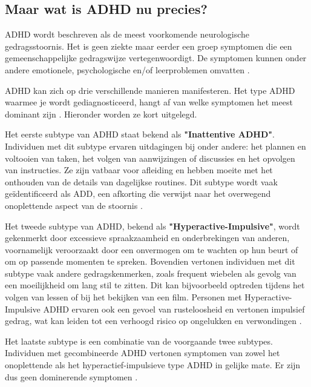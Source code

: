 \subsection{Maar wat is ADHD nu precies?}
ADHD wordt beschreven als de meest voorkomende neurologische gedragsstoornis. Het is geen ziekte maar eerder een groep symptomen die een gemeenschappelijke gedragswijze vertegenwoordigt. De symptomen kunnen onder andere emotionele, psychologische en/of leerproblemen omvatten \autocite{Furman2005whatisadhd}. \newline

ADHD kan zich op drie verschillende manieren manifesteren. Het type ADHD waarmee je wordt gediagnosticeerd, hangt af van welke symptomen het meest dominant zijn \autocite{diamond2005attention}. Hieronder worden ze kort uitgelegd. \newline

Het eerste subtype van ADHD staat bekend als \textbf{"Inattentive ADHD"}. Individuen met dit subtype ervaren uitdagingen bij onder andere: het plannen en voltooien van taken, het volgen van aanwijzingen of discussies en het opvolgen van instructies. Ze zijn vatbaar voor afleiding en hebben moeite met het onthouden van de details van dagelijkse routines. Dit subtype wordt vaak geïdentificeerd als ADD, een afkorting die verwijst naar het overwegend onoplettende aspect van de stoornis \autocite{wilcox2023what}. \newline

Het tweede subtype van ADHD, bekend als \textbf{"Hyperactive-Impulsive"}, wordt gekenmerkt door excessieve spraakzaamheid en onderbrekingen van anderen, voornamelijk veroorzaakt door een onvermogen om te wachten op hun beurt of om op passende momenten te spreken. Bovendien vertonen individuen met dit subtype vaak andere gedragskenmerken, zoals frequent wiebelen als gevolg van een moeilijkheid om lang stil te zitten. Dit kan bijvoorbeeld optreden tijdens het volgen van lessen of bij het bekijken van een film. Personen met Hyperactive-Impulsive ADHD ervaren ook een gevoel van rusteloosheid en vertonen impulsief gedrag, wat kan leiden tot een verhoogd risico op ongelukken en verwondingen \autocite{swanson1998attention}.\newline

Het laatste subtype is een combinatie van de voorgaande twee subtypes. Individuen met gecombineerde ADHD vertonen symptomen van zowel het onoplettende als het hyperactief-impulsieve type ADHD in gelijke mate. Er zijn dus geen dominerende symptomen \autocite{weiss2003chart}. \newline

